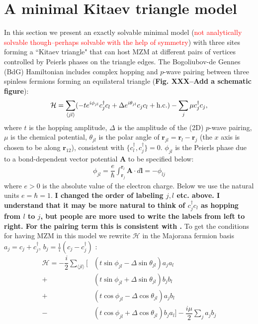\documentclass[aps,prb,showpacs,amsmath,twocolumn,amssymb,superscriptaddress]{revtex4-2}
\newcommand{\Red}[1]{\textcolor{red}{#1}}
\renewcommand{\vec}[1]{\mathbf{#1}}
\newcommand{\ham}{\mathcal{H}}
\newcommand{\cc}{c^{\dagger}}
\newcommand{\de}{\Delta}
\begin{document}
\section{A minimal Kitaev triangle model}

In this section we present an exactly solvable minimal model (\Red{not analytically solvable though--perhaps solvable with the help of symmetry}) with three sites forming a ``Kitaev triangle" that can host MZM at different pairs of vertices controlled by Peierls phases on the triangle edges. The Bogoliubov-de Gennes (BdG) Hamiltonian includes complex hopping and $p$-wave pairing between three spinless fermions forming an equilateral triangle ({\bf Fig. XXX--Add a schematic figure}):
\begin{equation}\label{eq:HBdG}
  \ham = \sum_{\langle j l \rangle} (-te^{i\phi_{jl}}\cc_{j} c_l + \de e^{i\theta_{jl}} c_{j} c_l + {\rm h.c.}) - \sum_{j} \mu \cc_j c_j,
\end{equation}
where $t$ is the hopping amplitude, $\de$ is the amplitude of the (2D) $p$-wave pairing, $\mu$ is the chemical potential, $\theta_{jl}$ is the polar angle of $\mathbf r_{jl} = \mathbf r_l - \mathbf r_j$ (the $x$ axis is chosen to be along $\mathbf r_{12}$), consistent with $\{c^\dag_l, c^\dag_j\} = 0$. $\phi_{jl}$ is the Peierls phase due to a bond-dependent vector potential $\mathbf A$ to be specified below: 
\begin{eqnarray}
\phi_{jl} = \dfrac{e}{\hbar} \int_{\mathbf r_j}^{\mathbf r_{l}} \vec{A} \cdot d\vec{l} = -\phi_{lj}
\end{eqnarray}
where $e>0$ is the absolute value of the electron charge. Below we use the natural units $e=\hbar=1$. {\bf I changed the order of labeling $j,l$ etc. above. I understand that it may be more natural to think of $c_j^\dag c_l$ as hopping from $l$ to $j$, but people are more used to write the labels from left to right. For the pairing term this is consistent with \cite{kitaevUnpairedMajoranaFermions2001}.} To get the conditions for having MZM in this model we rewrite $\mathcal{H}$ in the Majorana fermion basis $a_{j} = c_j + c^\dag_j$, $b_j = \frac{1}{i}(c_j - c^\dag_j)$ \cite{supp}:
\begin{align}\label{eq:H3M}
    \ham =  -\dfrac{i}{2} \sum_{\langle j l \rangle} \Big[&\left(t\sin\phi_{jl}-\de\sin\theta_{jl}\right) a_j a_l \\\nonumber
  +&\left(t\sin\phi_{jl}+\de\sin\theta_{jl}\right) b_j b_l  \\\nonumber
  +&\left(t\cos\phi_{jl} - \de\cos\theta_{jl}\right) a_j b_l  \\\nonumber
  -&\left(t\cos\phi_{jl}+\de\cos\theta_{jl}\right) b_j a_l\Big]  -\dfrac{i\mu}{2} \sum_j  a_j b_j
\end{align}
\end{document}
